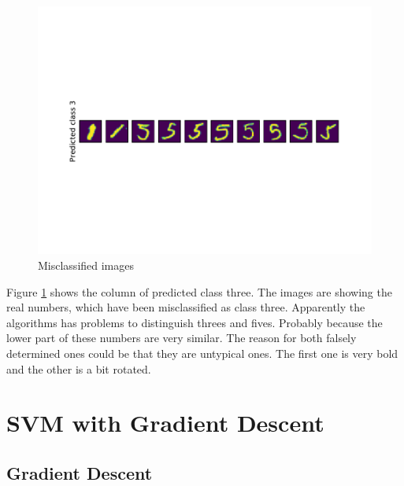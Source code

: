 \documentclass{article}
\begin{document}
\begin{figure}[!ht]
	\centering
	\includegraphics[trim=0cm 4cm 0cm 4cm, clip=true, width=\textwidth]{./Figures/3b_misclassifieditems.pdf}
	\caption{Misclassified images}
	\label{mnist_misclassified}
\end{figure}

Figure \ref{mnist_misclassified} shows the column of predicted class three. The images are showing the real numbers, which have been misclassified as class three. Apparently the algorithms has problems to distinguish threes and fives. Probably because the lower part of these numbers are very similar. The reason for both falsely determined ones could be that they are untypical ones. The first one is very bold and the other is a bit rotated.

\clearpage
\section{SVM with Gradient Descent}

\subsection{Gradient Descent}
\end{document}
